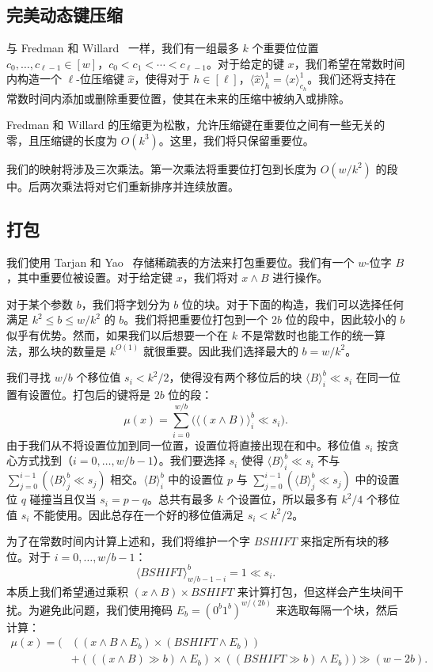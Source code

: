 \documentclass[11pt,a4paper]{ctexart}
\newcommand{\tto}{\text{0}}
\newcommand{\ttl}{\text{1}}
\newcommand{\lpiece}[3]{\langle #1 \rangle_{#2}^{#3}}
\newcommand{\AND}{\land}
\newcommand{\LSHIFT}{\ll}
\newcommand{\RSHIFT}{\gg}
\begin{document}
\subsection{完美动态键压缩}\label{sec:key-compress}

与 Fredman 和 Willard~\cite{fredman93fusion} 一样，我们有一组最多 $k$ 个重要位位置 $c_0, \dots, c_{\ell-1} \in [w]$，$c_0 < c_1 < \cdots < c_{\ell-1}$。对于给定的键 $x$，我们希望在常数时间内构造一个 $\ell$-位压缩键 $\hat{x}$，使得对于 $h \in [\ell]$，$\lpiece{\hat{x}}{h}{1} = \lpiece{x}{c_h}{1}$。我们还将支持在常数时间内添加或删除重要位置，使其在未来的压缩中被纳入或排除。

Fredman 和 Willard 的压缩更为松散，允许压缩键在重要位之间有一些无关的零，且压缩键的长度为 $O(k^3)$。这里，我们将只保留重要位。

我们的映射将涉及三次乘法。第一次乘法将重要位打包到长度为 $O(w/k^2)$ 的段中。后两次乘法将对它们重新排序并连续放置。

\subsection{打包}

我们使用 Tarjan 和 Yao~\cite{tarjan79sparse} 存储稀疏表的方法来打包重要位。我们有一个 $w$-位字 $B$，其中重要位被设置。对于给定键 $x$，我们将对 $x \AND B$ 进行操作。

对于某个参数 $b$，我们将字划分为 $b$ 位的块。对于下面的构造，我们可以选择任何满足 $k^2 \leq b \leq w/k^2$ 的 $b$。我们将把重要位打包到一个 $2b$ 位的段中，因此较小的 $b$ 似乎有优势。然而，如果我们以后想要一个在 $k$ 不是常数时也能工作的统一算法，那么块的数量是 $k^{O(1)}$ 就很重要。因此我们选择最大的 $b = w/k^2$。

我们寻找 $w/b$ 个移位值 $s_i < k^2/2$，使得没有两个移位后的块 $\lpiece{B}{i}{b} \LSHIFT s_i$ 在同一位置有设置位。打包后的键将是 $2b$ 位的段：
\[
\mu(x) = \sum_{i=0}^{w/b} \bigl(\lpiece{(x \AND B)}{i}{b} \LSHIFT s_i\bigr).
\]
由于我们从不将设置位加到同一位置，设置位将直接出现在和中。移位值 $s_i$ 按贪心方式找到（$i = 0, \dots, w/b-1$）。我们要选择 $s_i$ 使得 $\lpiece{B}{i}{b} \LSHIFT s_i$ 不与 $\sum_{j=0}^{i-1} (\lpiece{B}{j}{b} \LSHIFT s_j)$ 相交。$\lpiece{B}{i}{b}$ 中的设置位 $p$ 与 $\sum_{j=0}^{i-1} (\lpiece{B}{j}{b} \LSHIFT s_j)$ 中的设置位 $q$ 碰撞当且仅当 $s_i = p - q$。总共有最多 $k$ 个设置位，所以最多有 $k^2/4$ 个移位值 $s_i$ 不能使用。因此总存在一个好的移位值满足 $s_i < k^2/2$。

为了在常数时间内计算上述和，我们将维护一个字 $BSHIFT$ 来指定所有块的移位。对于 $i = 0, \dots, w/b-1$：
\[
\lpiece{BSHIFT}{w/b-1-i}{b} = 1 \LSHIFT s_i.
\]
本质上我们希望通过乘积 $(x \AND B) \times BSHIFT$ 来计算打包，但这样会产生块间干扰。为避免此问题，我们使用掩码 $E_b = (\tto^b\ttl^b)^{w/(2b)}$ 来选取每隔一个块，然后计算：
\begin{align*}
\mu(x) = \bigl(&((x \AND B \AND E_b) \times (BSHIFT \AND E_b)) \\
&+ (((x \AND B) \RSHIFT b) \AND E_b) \times ((BSHIFT \RSHIFT b) \AND E_b)\bigr) \RSHIFT (w-2b).
\end{align*}
\end{document}
